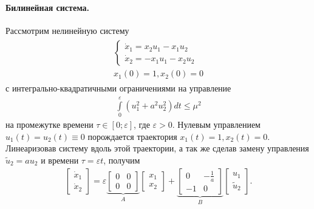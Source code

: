 \documentclass[../main.tex]{subfiles}
\begin{document}
\paragraph{Билинейная система.}
Рассмотрим нелинейную систему
\begin{gather}\label{sec1:system5}
\begin{gathered}
         \left\{ {\begin{array}{*{20}{l}}
                 {\dot{x}_1 =  x_2 u_1 - x_1 u_2}\\
                 {\dot{x}_2 =  -x_1 u_1 - x_2 u_2}
         \end{array}} \right.
         \\
         x_1(0) = 1, x_2(0) = 0
\end{gathered}
\end{gather}
с интегрально-квадратичными ограничениями на управление
\begin{gather*}
    \int \limits_0^{\varepsilon} \left( u_1^2 + a^2 u_2^2\right) dt \leq \mu^2
\end{gather*}     
на промежутке времени $ \tau \in \left[0;\varepsilon \right] $, где $ \varepsilon > 0 $.
Нулевым управлением $  u_1(t) = u_2(t) \equiv 0 $ порождается траектория $ x_1(t) = 1, x_2(t) = 0 $.
Линеаризовав систему вдоль этой траектории, а так же сделав замену управления $ {\tilde u_2} = a u_2 $ и времени  $ \tau =\varepsilon t$, получим
\begin{gather}\label{sec1:system5l}
     \left[ {\begin{array}{*{20}{c}}
             {{{\dot x}_1}}\\
             {{{\dot x}_2}}
     \end{array}} \right] = \varepsilon \underbrace {\left[ {\begin{array}{*{20}{c}}
                 0&0\\
                 0&0
         \end{array}} \right]}_A\left[ {\begin{array}{*{20}{c}}
             {{x_1}}\\
             {{x_2}}
     \end{array}} \right] + \underbrace {\left[ {\begin{array}{*{20}{c}}
                 0&-\frac{1}{a}\\
                 -1&0
         \end{array}} \right]}_B\left[ \begin{array}{c}
         u_1 \\ 
         \tilde{u}_2
     \end{array} \right].
\end{gather}
 
\end{document}

